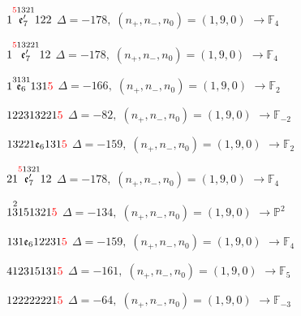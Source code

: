 \documentclass[10pt]{article}
\begin{document}
$1\overset{\textcolor{red}{5}1321}{\mathfrak{e}_7'}122$ \quad $\Delta=-178,\; (n_+,n_-,n_0)=(1,9,0)$ \quad $\to \mathbb{F}_{4}$

\smallskip

$1\overset{\textcolor{red}{5}13221}{\mathfrak{e}_7'}12$ \quad $\Delta=-178,\; (n_+,n_-,n_0)=(1,9,0)$ \quad $\to \mathbb{F}_{4}$

\smallskip

$1\overset{3131}{\mathfrak{e}_6}131\textcolor{red}{5}$ \quad $\Delta=-166,\; (n_+,n_-,n_0)=(1,9,0)$ \quad $\to \mathbb{F}_{2}$

\smallskip

$122313221\textcolor{red}{5}$ \quad $\Delta=-82,\; (n_+,n_-,n_0)=(1,9,0)$ \quad $\to \mathbb{F}_{-2}$

\smallskip

$13221\mathfrak{e}_6131\textcolor{red}{5}$ \quad $\Delta=-159,\; (n_+,n_-,n_0)=(1,9,0)$ \quad $\to \mathbb{F}_{2}$

\smallskip

$21\overset{\textcolor{red}{5}1321}{\mathfrak{e}_7'}12$ \quad $\Delta=-178,\; (n_+,n_-,n_0)=(1,9,0)$ \quad $\to \mathbb{F}_{4}$

\smallskip

$1\overset{2}{3}151321\textcolor{red}{5}$ \quad $\Delta=-134,\; (n_+,n_-,n_0)=(1,9,0)$ \quad $\to \mathbb{P}^2$

\smallskip

$131\mathfrak{e}_612231\textcolor{red}{5}$ \quad $\Delta=-159,\; (n_+,n_-,n_0)=(1,9,0)$ \quad $\to \mathbb{F}_{4}$

\smallskip

$412315131\textcolor{red}{5}$ \quad $\Delta=-161,\; (n_+,n_-,n_0)=(1,9,0)$ \quad $\to \mathbb{F}_{5}$

\smallskip

$122222221\textcolor{red}{5}$ \quad $\Delta=-64,\; (n_+,n_-,n_0)=(1,9,0)$ \quad $\to \mathbb{F}_{-3}$

\smallskip
\end{document}
